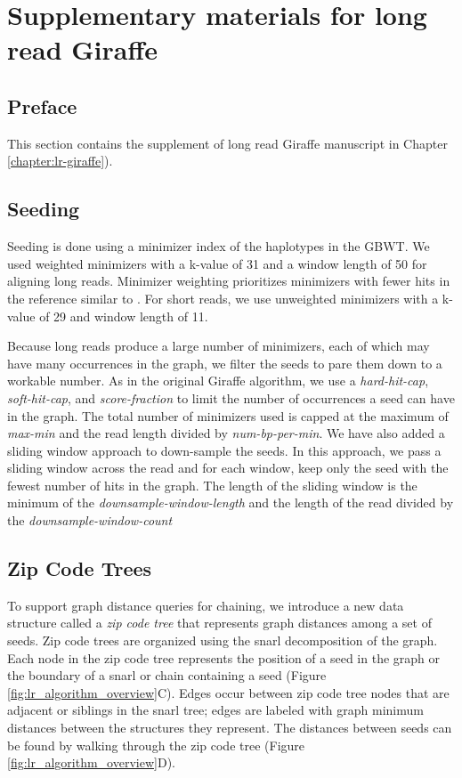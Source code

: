 \documentclass[11pt]{ucscthesis}
\begin{document}
\chapter{Supplementary materials for long read Giraffe}
\label{sec:appendix_lr_giraffe}
\section{Preface}
This section contains the supplement of long read Giraffe manuscript in Chapter \ref{chapter:lr-giraffe}).

\section{Seeding}
\label{sec:sup-seeding}

Seeding is done using a minimizer index of the haplotypes in the GBWT.
We used weighted minimizers with a k-value of 31 and a window length of 50 for aligning long reads.
Minimizer weighting prioritizes minimizers with fewer hits in the reference similar to \citet{jain_winnowmap_2020}.
For short reads, we use unweighted minimizers with a k-value of 29 and window length of 11.

Because long reads produce a large number of minimizers, each of which may have many occurrences in the graph, we filter the seeds to pare them down to a workable number.
As in the original Giraffe algorithm, we use a \emph{hard-hit-cap}, \emph{soft-hit-cap}, and \emph{score-fraction} to limit the number of occurrences a seed can have in the graph.
The total number of minimizers used is capped at the maximum of \emph{max-min} and the read length divided by \emph{num-bp-per-min}.
We have also added a sliding window approach to down-sample the seeds.
In this approach, we pass a sliding window across the read and for each window, keep only the seed with the fewest number of hits in the graph.
The length of the sliding window is the minimum of the \emph{downsample-window-length} and the length of the read divided by the \emph{downsample-window-count}


\section{Zip Code Trees}
\label{sec:sup-ziptrees}

To support graph distance queries for chaining, we introduce a new data structure called a \emph{zip code tree} that represents graph distances among a set of seeds.
Zip code trees are organized using the snarl decomposition of the graph.
Each node in the zip code tree represents the position of a seed in the graph or the boundary of a snarl or chain containing a seed (Figure \ref{fig:lr_algorithm_overview}C).
Edges occur between zip code tree nodes that are adjacent or siblings in the snarl tree; edges are labeled with graph minimum distances between the structures they represent.
The distances between seeds can be found by walking through the zip code tree (Figure \ref{fig:lr_algorithm_overview}D).
\end{document}
